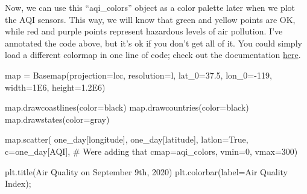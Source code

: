 \documentclass[
  letterpaper,
  DIV=11,
  numbers=noendperiod]{scrreprt}
\newenvironment{Shaded}{\begin{snugshade}}{\end{snugshade}}
\newcommand{\BuiltInTok}[1]{\textcolor[rgb]{0.00,0.23,0.31}{#1}}
\newcommand{\CommentTok}[1]{\textcolor[rgb]{0.37,0.37,0.37}{#1}}
\newcommand{\DecValTok}[1]{\textcolor[rgb]{0.68,0.00,0.00}{#1}}
\newcommand{\FloatTok}[1]{\textcolor[rgb]{0.68,0.00,0.00}{#1}}
\newcommand{\NormalTok}[1]{\textcolor[rgb]{0.00,0.23,0.31}{#1}}
\newcommand{\OperatorTok}[1]{\textcolor[rgb]{0.37,0.37,0.37}{#1}}
\newcommand{\StringTok}[1]{\textcolor[rgb]{0.13,0.47,0.30}{#1}}
\newcommand{\VariableTok}[1]{\textcolor[rgb]{0.07,0.07,0.07}{#1}}
\begin{document}
Now, we can use this ``aqi\_colors'' object as a color palette later
when we plot the AQI sensors. This way, we will know that green and
yellow points are OK, while red and purple points represent hazardous
levels of air pollution. I've annotated the code above, but it's ok if
you don't get all of it. You could simply load a different colormap in
one line of code; check out the documentation
\href{https://matplotlib.org/stable/tutorials/colors/colormaps.html}{here}.

\begin{Shaded}
\begin{Highlighting}[]
\BuiltInTok{map} \OperatorTok{=}\NormalTok{ Basemap(projection}\OperatorTok{=}\StringTok{\textquotesingle{}lcc\textquotesingle{}}\NormalTok{, resolution}\OperatorTok{=}\StringTok{\textquotesingle{}l\textquotesingle{}}\NormalTok{, }
\NormalTok{            lat\_0}\OperatorTok{=}\FloatTok{37.5}\NormalTok{, lon\_0}\OperatorTok{={-}}\DecValTok{119}\NormalTok{,}
\NormalTok{            width}\OperatorTok{=}\FloatTok{1E6}\NormalTok{, height}\OperatorTok{=}\FloatTok{1.2E6}\NormalTok{)}

\BuiltInTok{map}\NormalTok{.drawcoastlines(color}\OperatorTok{=}\StringTok{\textquotesingle{}black\textquotesingle{}}\NormalTok{)}
\BuiltInTok{map}\NormalTok{.drawcountries(color}\OperatorTok{=}\StringTok{\textquotesingle{}black\textquotesingle{}}\NormalTok{)}
\BuiltInTok{map}\NormalTok{.drawstates(color}\OperatorTok{=}\StringTok{\textquotesingle{}gray\textquotesingle{}}\NormalTok{)}

\BuiltInTok{map}\NormalTok{.scatter(}
\NormalTok{      one\_day[}\StringTok{\textquotesingle{}longitude\textquotesingle{}}\NormalTok{], }
\NormalTok{      one\_day[}\StringTok{\textquotesingle{}latitude\textquotesingle{}}\NormalTok{], }
\NormalTok{      latlon}\OperatorTok{=}\VariableTok{True}\NormalTok{, }
\NormalTok{      c}\OperatorTok{=}\NormalTok{one\_day[}\StringTok{\textquotesingle{}AQI\textquotesingle{}}\NormalTok{], }\CommentTok{\# We\textquotesingle{}re adding that }
\NormalTok{      cmap}\OperatorTok{=}\NormalTok{aqi\_colors, }
\NormalTok{      vmin}\OperatorTok{=}\DecValTok{0}\NormalTok{, }
\NormalTok{      vmax}\OperatorTok{=}\DecValTok{300}\NormalTok{)}


\NormalTok{plt.title(}\StringTok{\textquotesingle{}Air Quality on September 9th, 2020\textquotesingle{}}\NormalTok{)}
\NormalTok{plt.colorbar(label}\OperatorTok{=}\StringTok{\textquotesingle{}Air Quality Index\textquotesingle{}}\NormalTok{)}\OperatorTok{;}
\end{Highlighting}
\end{Shaded}
\end{document}

